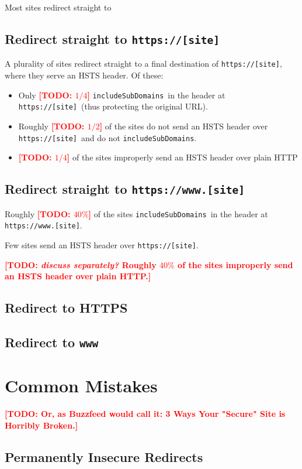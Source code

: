 \documentclass[conference]{./IEEEtran}
\newcommand{\todo}[1]{\textcolor{red}{\textbf{[TODO: #1]}}}
\newcommand{\td}[2]{\textcolor{red}{\textbf{[TODO: {\it{#1}} #2]}}}
\newcommand{\site}[1]{\texttt{#1}}
\newcommand{\code}[1]{\texttt{#1}}
\newcommand{\iSD}{{\code{includeSubDomains}}}
\newcommand{\genericsite}{[site]}
\newcommand{\s}{{\site{https://\genericsite}}}
\newcommand{\sw}{{\site{https://www.\genericsite}}}
\theoremstyle{plain}
\begin{document}
Most sites redirect straight to 

\subsection{Redirect straight to \s}

A plurality of sites redirect straight to a final destination of \s, where they serve an HSTS header. Of these:

\begin{itemize}
\item Only \todo{$1/4$} \iSD~in the header at \s~(thus protecting the original URL).
\item Roughly \todo{$1/2$} of the sites do not send an HSTS header over \s~and do not \iSD.
\item \todo{$1/4$} of the sites improperly send an HSTS header over plain HTTP%
\end{itemize}

\subsection{Redirect straight to \sw}

\item Roughly \todo{$40\%$} of the sites \iSD~in the header at \sw.
\item Few sites send an HSTS header over \s.
\item \td{discuss separately?}{Roughly $40\%$ of the sites improperly send an HSTS header over plain HTTP.}

\subsection{Redirect to HTTPS}

\subsection{Redirect to \code{www}}

\section{Common Mistakes}
\todo{Or, as Buzzfeed would call it: 3 Ways Your "Secure" Site is Horribly Broken.}

\subsection{Permanently Insecure Redirects}
\end{document}
